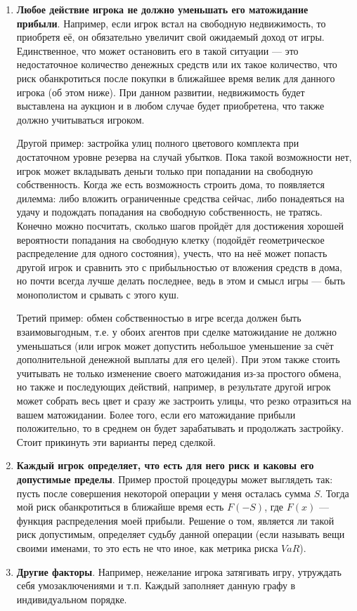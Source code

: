 	\begin{enumerate}
		\renewcommand{\theenumi}{\Roman{enumi}}
		\item \textbf{Любое действие игрока не должно уменьшать его матожидание прибыли}. Например, если игрок встал на свободную недвижимость, то приобретя её, он обязательно увеличит свой ожидаемый доход от игры. Единственное, что может остановить его в такой ситуации --- это недостаточное количество денежных средств или их такое количество, что риск обанкротиться после покупки в ближайшее время велик для данного игрока (об этом ниже). При данном развитии, недвижимость будет выставлена на аукцион и в любом случае будет приобретена, что также должно учитываться игроком.
		
		 Другой пример: застройка улиц полного цветового комплекта при достаточном уровне резерва на случай убытков. Пока такой возможности нет, игрок может вкладывать деньги только при попадании на свободную собственность. Когда же есть возможность строить дома, то появляется дилемма: либо вложить ограниченные средства сейчас, либо понадеяться на удачу и подождать попадания на свободную собственность, не тратясь. Конечно можно посчитать, сколько шагов пройдёт для достижения хорошей вероятности попадания на свободную клетку (подойдёт геометрическое распределение для одного состояния), учесть, что на неё может попасть другой игрок и сравнить это с прибыльностью от вложения средств в дома, но почти всегда лучше делать последнее, ведь в этом и смысл игры --- быть монополистом и срывать с этого куш.
		 
		 Третий пример: обмен собственностью в игре всегда должен быть взаимовыгодным, т.е. у обоих агентов при сделке матожидание не должно уменьшаться (или игрок может допустить небольшое уменьшение за счёт дополнительной денежной выплаты для его целей). При этом также стоить учитывать не только изменение своего матожидания из-за простого обмена, но также и последующих действий, например, в результате другой игрок может собрать весь цвет и сразу же застроить улицы, что резко отразиться на вашем матожидании. Более того, если его матожидание прибыли положительно, то в среднем он будет зарабатывать и продолжать застройку. Стоит прикинуть эти варианты перед сделкой.
		 
		 \item \textbf{Каждый игрок определяет, что есть для него риск и каковы его допустимые пределы}. Пример простой процедуры может выглядеть так: пусть после совершения некоторой операции у меня осталась сумма $S$. Тогда мой риск обанкротиться в ближайше время есть $F(-S)$, где $F(x)$ --- функция распределения моей прибыли. Решение о том, является ли такой риск допустимым, определяет судьбу данной операции (если называть вещи своими именами, то это есть не что иное, как метрика риска $VaR$).
		 
		 \item \textbf{Другие факторы}. Например, нежелание игрока затягивать игру, утруждать себя умозаключениями и т.п. Каждый заполняет данную графу в индивидуальном порядке.
	\end{enumerate}
	
